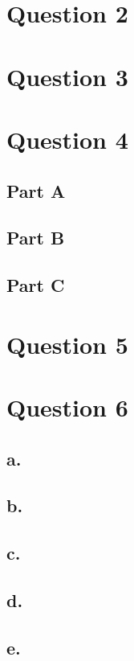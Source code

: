 \documentclass{article}
\theoremstyle{mytheoremstyle}
\theoremstyle{mytheoremstyle}
\theoremstyle{myproblemstyle}
\begin{document}
    \section*{Question 2}
    \section*{Question 3}
    \section*{Question 4}
    \subsection*{Part A}
    \subsection*{Part B}
    \subsection*{Part C}
    \section*{Question 5}
    \section*{Question 6}
    \subsection*{a.}
    \subsection*{b.}
    \subsection*{c.}
    \subsection*{d.}
    \subsection*{e.}
\end{document}
